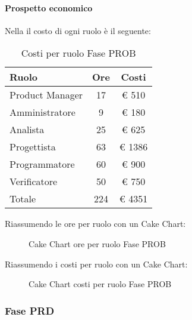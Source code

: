 			\paragraph{Prospetto economico}
				Nella  il costo di ogni ruolo è il seguente:
				\begin{table}
					\begin{center}
						\begin{tabular}{| l | c | c |}
							\hline
							Ruolo 				& Ore 		& Costi  \\ \hline
							
							Product Manager		& 17 		& \euro{} 510 	\\
							Amministratore 		& 9 		& \euro{} 180 	\\
							Analista	 		& 25 		& \euro{} 625 	\\
							Progettista 		& 63 		& \euro{} 1386  	\\
							Programmatore		& 60 		& \euro{} 900 	\\
							Verificatore		& 50 		& \euro{} 750 	\\ \hline \hline
							
							Totale	 			& 224 		& \euro{} 4351 	\\ \hline
						\end{tabular}
					\end{center}
					\caption{Costi per ruolo Fase PROB}
				\end{table}
				Riassumendo le ore per ruolo con un Cake Chart:
				\begin{figure}\centering
					\caption{Cake Chart ore per ruolo Fase PROB}
				\end{figure}
				Riassumendo i costi per ruolo con un Cake Chart:
				\begin{figure}\centering
					\caption{Cake Chart costi per ruolo Fase PROB}
				\end{figure}
		\subsubsection{Fase PRD}
